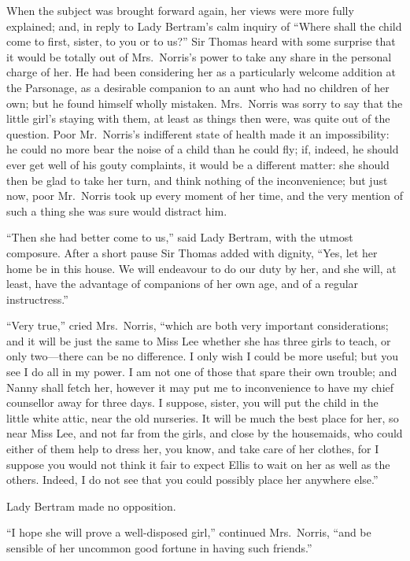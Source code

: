 \documentclass{article}
\begin{document}
When the subject was brought forward again, her views
were more fully explained; and, in reply to Lady Bertram's
calm inquiry of ``Where shall the child come to first,
sister, to you or to us?''  Sir Thomas heard with some
surprise that it would be totally out of Mrs.\ Norris's
power to take any share in the personal charge of her.
He had been considering her as a particularly welcome
addition at the Parsonage, as a desirable companion
to an aunt who had no children of her own; but he found
himself wholly mistaken.  Mrs.\ Norris was sorry to say
that the little girl's staying with them, at least
as things then were, was quite out of the question.
Poor Mr.\ Norris's indifferent state of health made it
an impossibility:  he could no more bear the noise of a child
than he could fly; if, indeed, he should ever get well
of his gouty complaints, it would be a different matter:
she should then be glad to take her turn, and think nothing
of the inconvenience; but just now, poor Mr.\ Norris
took up every moment of her time, and the very mention
of such a thing she was sure would distract him.

``Then she had better come to us,'' said Lady Bertram,
with the utmost composure.  After a short pause Sir Thomas
added with dignity, ``Yes, let her home be in this house.
We will endeavour to do our duty by her, and she will,
at least, have the advantage of companions of her own age,
and of a regular instructress.''

``Very true,'' cried Mrs.\ Norris, ``which are both very
important considerations; and it will be just the same
to Miss Lee whether she has three girls to teach,
or only two---there can be no difference.  I only wish I
could be more useful; but you see I do all in my power.
I am not one of those that spare their own trouble;
and Nanny shall fetch her, however it may put me
to inconvenience to have my chief counsellor away for
three days.  I suppose, sister, you will put the child
in the little white attic, near the old nurseries.
It will be much the best place for her, so near Miss Lee,
and not far from the girls, and close by the housemaids,
who could either of them help to dress her, you know,
and take care of her clothes, for I suppose you would not
think it fair to expect Ellis to wait on her as well as
the others.  Indeed, I do not see that you could possibly
place her anywhere else.''

Lady Bertram made no opposition.

``I hope she will prove a well-disposed girl,''
continued Mrs.\ Norris, ``and be sensible of her uncommon
good fortune in having such friends.''
\end{document}
